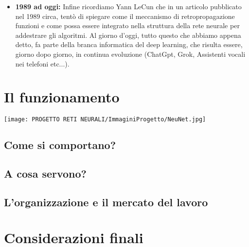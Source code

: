 \documentclass{article}
\begin{document}
\begin{justify}
\begin{itemize}
    \item \textbf{1989 ad oggi:} Infine ricordiamo Yann LeCun che in un articolo pubblicato nel 1989 circa, tentò di spiegare come il meccanismo di retropropagazione funzioni e come possa essere integrato nella struttura della rete neurale per addestrare gli algoritmi\citep{lecun1989backpropagation}. Al giorno d'oggi, tutto questo che abbiamo appena detto, fa parte della branca informatica del deep learning, che risulta essere, giorno dopo giorno, in continua evoluzione (ChatGpt, Grok, Assistenti vocali nei telefoni etc...).
\end{itemize}
\end{justify}
\centering \newpage
\section{Il funzionamento}

 \texttt{[image: PROGETTO RETI NEURALI/ImmaginiProgetto/NeuNet.jpg]}
    \label{F1:foto reti}

\flushleft \subsection{Come si comportano?}

\flushleft \subsection{A cosa servono?}
 
\flushleft \subsection{L'organizzazione e il mercato del lavoro}

\centering \newpage
\section{Considerazioni finali}


\end{document}
